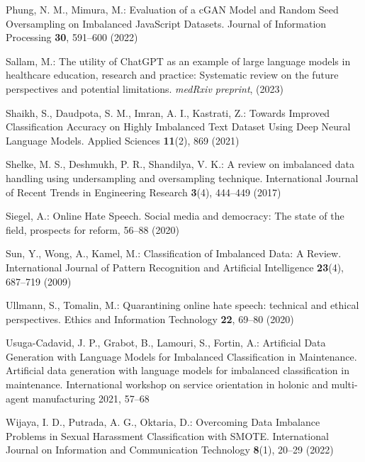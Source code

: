 \documentclass[runningheads]{llncs}
\begin{document}
\begin{thebibliography}{27}
Phung, N. M., Mimura, M.: Evaluation of a cGAN Model and Random Seed Oversampling on Imbalanced JavaScript Datasets. Journal of Information Processing \textbf{30}, 591--600 (2022)

Sallam, M.: The utility of ChatGPT as an example of large language models in healthcare education, research and practice: Systematic review on the future perspectives and potential limitations. \emph{medRxiv preprint}, (2023)

Shaikh, S., Daudpota, S. M., Imran, A. I., Kastrati, Z.: Towards Improved Classification Accuracy on Highly Imbalanced Text Dataset Using Deep Neural Language Models. Applied Sciences \textbf{11}(2), 869 (2021)

Shelke, M. S., Deshmukh, P. R., Shandilya, V. K.: A review on imbalanced data handling using undersampling and oversampling technique. International Journal of Recent Trends in Engineering Research \textbf{3}(4), 444--449 (2017)

Siegel, A.: Online Hate Speech. Social media and democracy: The state of the field, prospects for reform, 56--88 (2020)

Sun, Y., Wong, A., Kamel, M.: Classification of Imbalanced Data: A Review. International Journal of Pattern Recognition and Artificial Intelligence \textbf{23}(4), 687--719 (2009)

Ullmann, S., Tomalin, M.: Quarantining online hate speech: technical and ethical perspectives. Ethics and Information Technology \textbf{22}, 69--80 (2020)

Usuga-Cadavid, J. P., Grabot, B., Lamouri, S., Fortin, A.: Artificial Data Generation with Language Models for Imbalanced Classification in Maintenance. Artificial data generation with language models for imbalanced classification in maintenance. International workshop on service orientation in holonic and multi-agent manufacturing 2021, 57--68

Wijaya, I. D., Putrada, A. G., Oktaria, D.: Overcoming Data Imbalance Problems in Sexual Harassment Classification with SMOTE. International Journal on Information and Communication Technology \textbf{8}(1), 20--29 (2022)

\end{thebibliography}
\end{document}

